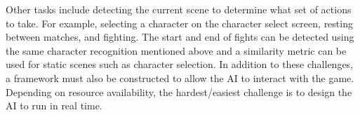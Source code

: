 \documentclass[12pt,a4paper, twocolumn]{article}
\begin{document}
Other tasks include detecting the current scene to determine what set of actions to take.
For example, selecting a character on the character select screen, resting between matches, and fighting.
The start and end of fights can be detected using the same character recognition mentioned above and a similarity metric can be used for static scenes such as character selection. 
In addition to these challenges, a framework must also be constructed to allow the AI to interact with the game.
Depending on resource availability, the hardest/easiest challenge is to design the AI to run in real time.

\newpage


\end{document}
